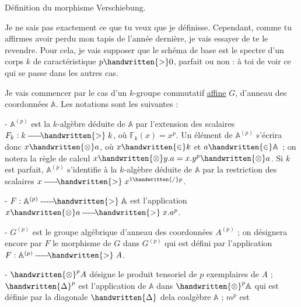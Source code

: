 
\begin{center}
Définition du morphisme Verschiebung.
\end{center}

Je ne sais pas exactement ce que tu veux que je définisse. Cependant, comme tu affirmes avoir perdu mon tapis de l'année dernière, je vais essayer de te le revendre. Pour cela, je vais supposer que le schéma de base est le spectre d'un corps $k$ de caractéristique $p\handwritten{>}0$, parfait ou non : à toi de voir ce qui se passe dans les autres cas.

Je vais commencer par le cas d'un $k$-groupe commutatif \uline{affine} $G$, d'anneau des coordonnées $\mathbb{A}$. Les notations sont les suivantes :

\noindent - $\mathbb{A}^{(p)}$ est la $k$-algèbre déduite de $\mathbb{A}$ par l'extension des scalaires $F_k:k\mathrel{\text{-{}-{}-{}-{}-}\!\handwritten{>}}k$, où $\mathbb{F}_k(x)=x^p$. Un élément de $\mathbb{A}^{(p)}$ s'écrira donc $x\handwritten{\otimes}a$, où $x\handwritten{\in}k$ et $a\handwritten{\in}\mathbb{A}$ ; on notera la règle de calcul $x\handwritten{\otimes}y.a=x.y^p\handwritten{\otimes}a$. Si $k$ est parfait, $\mathbb{A}^{(p)}$ s'identifie à la $k$-algèbre déduite de $\mathbb{A}$ par la restriction des scalaires $x\mathrel{\text{-{}-{}-{}-{}-}\!\handwritten{>}}x^{1\handwritten{/}p}$.

\noindent - $F:\mathbb{A}^{(p)}\mathrel{\text{-{}-{}-{}-{}-}\!\handwritten{>}}\mathbb{A}$ est l'application  $x\handwritten{\otimes}a\mathrel{\text{-{}-{}-{}-{}-}\!\handwritten{>}}x.a^p$.

\noindent - $G^{(p)}$ est le groupe algébrique d'anneau des coordonnées $A^{(p)}$ ; on désignera encore par $F$ le morphisme de $G$ dans $G^{(p)}$ qui est défini par l'application $F:\mathbb{A}^{(p)}\mathrel{\text{-{}-{}-{}-{}-}\!\handwritten{>}}A$.

\noindent - $\handwritten{\otimes}^{p}A$ désigne le produit tensoriel de $p$ exemplaires de $A$ ; $\handwritten{\Delta}^{p}$ est l'application de $\mathbb{A}$ dans $\handwritten{\otimes}^{p}\mathbb{A}$ qui est définie par la diagonale $\handwritten{\Delta}$ dela coalgèbre $\mathbb{A}$ ; $m^p$ est
